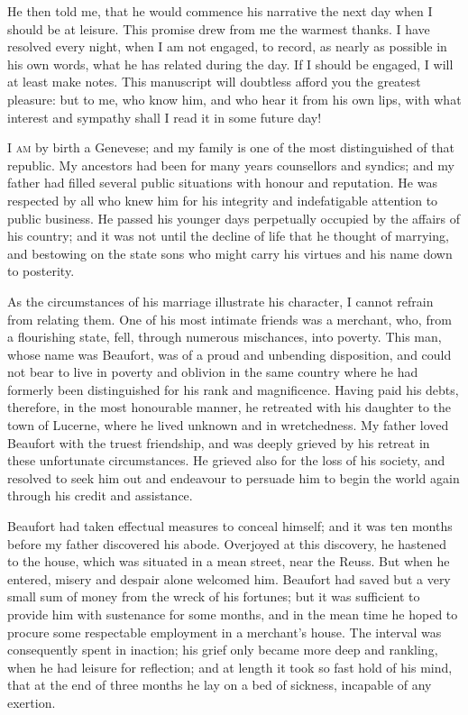 He then told me, that he would commence
his narrative the next day when
I should be at leisure. This promise
drew from me the warmest thanks. I
have resolved every night, when I am
not engaged, to record, as nearly as
possible in his own words, what he has
related during the day. If I should
be engaged, I will at least make notes.
This manuscript will doubtless afford
you the greatest pleasure: but to me,
who know him, and who hear it from
his own lips, with what interest and
sympathy shall I read it in some future
day!


\textsc{I am} by birth a Genevese; and my
family is one of the most distinguished
of that republic. My ancestors had
been for many years counsellors and
syndics; and my father had filled several
public situations with honour and
reputation. He was respected by all
who knew him for his integrity and
indefatigable attention to public business.
He passed his younger days
perpetually occupied by the affairs of
his country; and it was not until the
decline of life that he thought of marrying,
and bestowing on the state sons
who might carry his virtues and his
name down to posterity.

As the circumstances of his marriage
illustrate his character, I cannot refrain
from relating them. One of his most
intimate friends was a merchant, who,
from a flourishing state, fell, through
numerous mischances, into poverty.
This man, whose name was Beaufort,
was of a proud and unbending disposition,
and could not bear to live in poverty
and oblivion in the same country
where he had formerly been distinguished
for his rank and magnificence.
Having paid his debts, therefore, in the
most honourable manner, he retreated
with his daughter to the town of Lucerne,
where he lived unknown and in
wretchedness. My father loved Beaufort
with the truest friendship, and was
deeply grieved by his retreat in these
unfortunate circumstances. He grieved
also for the loss of his society, and
resolved to seek him out and endeavour
to persuade him to begin the world
again through his credit and assistance.

Beaufort had taken effectual measures
to conceal himself; and it was
ten months before my father discovered
his abode. Overjoyed at this discovery,
he hastened to the house, which was
situated in a mean street, near the
Reuss. But when he entered, misery
and despair alone welcomed him. Beaufort
had saved but a very small sum of
money from the wreck of his fortunes;
but it was sufficient to provide him
with sustenance for some months, and
in the mean time he hoped to procure
some respectable employment in a merchant's
house. The interval was consequently
spent in inaction; his grief
only became more deep and rankling,
when he had leisure for reflection; and
at length it took so fast hold of his
mind, that at the end of three months
he lay on a bed of sickness, incapable
of any exertion.

